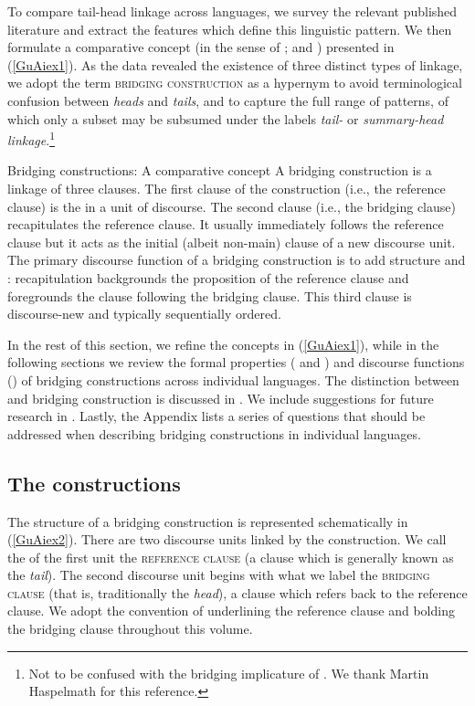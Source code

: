 \documentclass[output=paper]{LSP/langsci}
\begin{document}
To compare tail-head linkage across languages, we survey the relevant published literature and extract the features which define this linguistic pattern. We then formulate a comparative concept (in the sense of \citealt{haspelmath10, haspelmath16}; and \citealt{croft.2016}) presented in (\ref{GuAiex1}). As the data revealed the existence of three distinct types of linkage, we adopt the term \textsc{bridging construction} as a hypernym to avoid terminological confusion between \textit{heads} and \textit{tails}, and to capture the full range of patterns, of which only a subset may be subsumed under the labels \textit{tail-} or \textit{summary-head linkage}.\footnote{Not to be confused with the bridging implicature of \citet{clark75}. We thank Martin Haspelmath for this reference.} 

\begin{exe}
\ex	\label{GuAiex1}
\glt Bridging constructions: A comparative concept
\glt A bridging construction is a linkage of three clauses. The first clause of the construction (i.e., the reference clause) is the  in a unit of discourse. The second clause (i.e., the bridging clause) recapitulates the reference clause. It usually immediately follows the reference clause but it acts as the initial (albeit non-main) clause of a new discourse unit. The primary discourse function of a bridging construction is to add structure and : recapitulation backgrounds the proposition of the reference clause and foregrounds the clause following the bridging clause. This third clause is discourse-new and typically sequentially ordered.
\end{exe}
 
In the rest of this section, we refine the concepts in (\ref{GuAiex1}), while in the following sections we review the formal properties ( and ) and discourse functions () of bridging constructions across individual languages. The distinction between  and bridging construction is discussed in . We include suggestions for future research in . Lastly, the Appendix lists a series of questions that should be addressed when describing bridging constructions in individual languages. 

\subsection{The constructions}
\label{GuAi1.1construction}
The structure of a bridging construction is represented schematically in (\ref{GuAiex2}). There are two discourse units linked by the construction. We call the  of the first unit the \textsc{reference clause} (a clause which is generally known as the \textit{tail}). The second discourse unit begins with what we label the \textsc{bridging clause} (that is, traditionally the \textit{head}), a clause which refers back to the reference clause. We adopt the convention of underlining the reference clause and bolding the bridging clause throughout this volume. 
\end{document}
